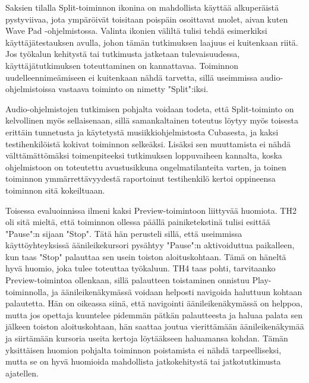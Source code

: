 \documentclass[utf8]{gradu3}
\begin{document}
Saksien tilalla Split-toiminnon ikonina on mahdollista käyttää alkuperäistä pystyviivaa, jota ympäröivät toisitaan poispäin osoittavat nuolet, aivan kuten Wave Pad -ohjelmistossa. Valinta ikonien väliltä tulisi tehdä esimerkiksi käyttäjätestauksen avulla, johon tämän tutkimuksen laajuus ei kuitenkaan riitä. Jos työkalun kehitystä tai tutkimusta jatketaan tulevaisuudessa, käyttäjätutkimuksen toteuttaminen on kannattavaa. Toiminnon uudelleennimeämiseen ei kuitenkaan nähdä tarvetta, sillä useimmissa audio-ohjelmistoissa vastaava toiminto on nimetty "Split":iksi.

Audio-ohjelmistojen tutkimisen pohjalta voidaan todeta, että Split-toiminto on kelvollinen myös sellaisenaan, sillä samankaltainen toteutus löytyy myös toisesta erittäin tunnetusta ja käytetystä musiikkiohjelmistosta Cubasesta, ja kaksi testihenkilöistä kokivat toiminnon selkeäksi. Lisäksi sen muuttamista ei nähdä välttämättömäksi toimenpiteeksi tutkimuksen loppuvaiheen kannalta, koska ohjelmistoon on toteutettu avustusikkuna ongelmatilanteita varten, ja toinen toiminnon ymmärrettävyydestä raportoinut testihenkilö kertoi oppineensa toiminnon sitä kokeiltuaan.

Toisessa evaluoinnissa ilmeni kaksi Preview-toimintoon liittyvää huomiota. TH2 oli sitä mieltä, että toiminnon ollessa päällä painiketekstinä tulisi esittää "Pause":n sijaan "Stop". Tätä hän perusteli sillä, että useimmissa käyttöyhteyksissä äänileikekursori pysähtyy "Pause":n aktivoiduttua paikalleen, kun taas "Stop" palauttaa sen usein toiston aloituskohtaan. Tämä on häneltä hyvä huomio, joka tulee toteuttaa työkaluun. TH4 taas pohti, tarvitaanko Preview-toimintoa ollenkaan, sillä palautteen toistaminen onnistuu Play-toiminnolla, ja äänileikenäkymässä voidaan helposti navigoida haluttuun kohtaan palautetta. Hän on oikeassa siinä, että navigointi äänileikenäkymässä on helppoa, mutta jos opettaja kuuntelee pidemmän pätkän palautteesta ja haluaa palata sen jälkeen toiston aloituskohtaan, hän saattaa joutua vierittämään äänileikenäkymää ja siirtämään kursoria useita kertoja löytääkseen haluamansa kohdan. Tämän yksittäisen huomion pohjalta toiminnon poistamista ei nähdä tarpeelliseksi, mutta se on hyvä huomioida mahdollista jatkokehitystä tai jatkotutkimusta ajatellen.
\end{document}
